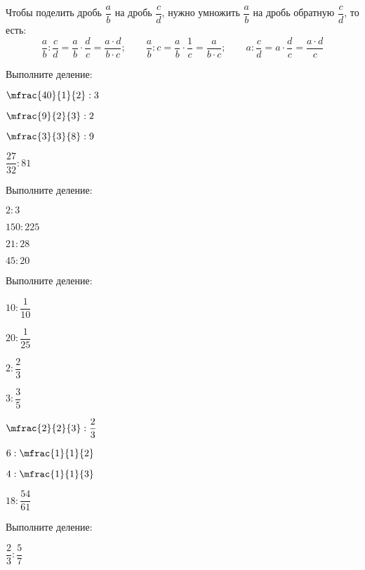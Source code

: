 %
%
\begin{class}[number=2]
	\begin{definit}
		Чтобы поделить дробь \( \dfrac{a}{b} \) на дробь \( \dfrac{c}{d} \), нужно умножить \( \dfrac{a}{b} \) на дробь обратную \( \dfrac{c}{d} \), то есть:
		\[ \dfrac{a}{b}:\dfrac{c}{d}=\dfrac{a}{b}\cdot\dfrac{d}{c}=\dfrac{a\cdot d}{b\cdot c};\qquad\dfrac{a}{b}:c=\dfrac{a}{b}\cdot\dfrac{1}{c}=\dfrac{a}{b\cdot c};\qquad a:\dfrac{c}{d}=a\cdot\dfrac{d}{c}=\dfrac{a\cdot d}{c} \]
	\end{definit}
	\begin{listofex}
		\item Выполните деление:
		\begin{enumcols}[itemcolumns=4]
			\item \( \mfrac{40}{1}{2}:3 \)
			\item \( \mfrac{9}{2}{3}:2 \)
			\item \( \mfrac{3}{3}{8}:9 \)
			\item \( \dfrac{27}{32}:81 \)
		\end{enumcols}
		\item Выполните деление:
		\begin{enumcols}[itemcolumns=4]
			\item \( 2:3 \)
			\item \( 150:225 \)
			\item \( 21:28 \)
			\item \( 45:20 \)
		\end{enumcols}
		\item Выполните деление:
		\begin{enumcols}[itemcolumns=4]
			\item \( 10:\dfrac{1}{10} \)
			\item \( 20:\dfrac{1}{25} \)
			\item \( 2:\dfrac{2}{3} \)
			\item \( 3:\dfrac{3}{5} \)
			\item \( \mfrac{2}{2}{3}:\dfrac{2}{3} \)
			\item \( 6:\mfrac{1}{1}{2} \)
			\item \( 4:\mfrac{1}{1}{3} \)
			\item \( 18:\dfrac{54}{61} \)
		\end{enumcols}
		\item Выполните деление:
		\begin{enumcols}[itemcolumns=4]
			\item \( \dfrac{2}{3}:\dfrac{5}{7} \)

\end{enumcols}
\end{listofex}
\end{class}
